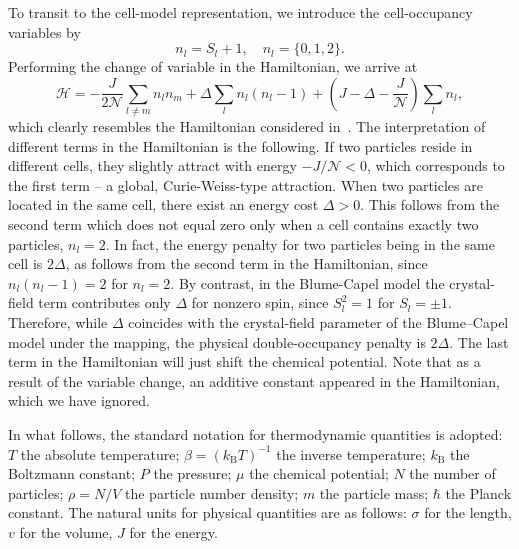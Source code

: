 \documentclass[pdflatex,sn-mathphys-num]{sn-jnl}%
\theoremstyle{thmstyleone}%
\theoremstyle{thmstyletwo}%
\theoremstyle{thmstylethree}%
\begin{document}
	To transit to the cell-model representation, we introduce the cell-occupancy variables by
	\begin{equation}
		n_l = S_l + 1, \quad n_l = \{0,1,2\}.
	\end{equation}
	Performing the change of variable in the Hamiltonian, we arrive at
	\begin{equation}
		\label{eq:hamiltonian}
		\mathscr{H} = -\frac{J}{2\mathscr{N}} \sum_{l \neq m} n_l n_m + \Delta \sum_l n_l (n_l - 1) + \left(J - \Delta - \frac{J}{\mathscr{N}}\right) \sum_l n_l,
	\end{equation}
	which clearly resembles the Hamiltonian considered in~\cite[Eq.~(1)]{LYZ21}.
	The interpretation of different terms in the Hamiltonian is the following. If two particles reside in different cells, they slightly attract with energy $-J/\mathscr{N} < 0$, which corresponds to the first term -- a global, Curie-Weiss-type attraction. When two particles are located in the same cell, there exist an energy cost $\Delta > 0$. This follows from the second term which does not equal zero only when a cell contains exactly two particles, $n_l=2$. In fact, the energy penalty for two particles being in the same cell is $2\Delta$, as follows from the second term in the Hamiltonian, since $n_l(n_l-1) =2$ for $n_l=2$. By contrast, in the Blume-Capel model the crystal-field term contributes only $\Delta$ for nonzero spin, since $S_l^2=1$ for $S_l = \pm 1$. Therefore, while $\Delta$ coincides with the crystal-field parameter of the Blume--Capel model under the mapping, the physical double-occupancy penalty is $2\Delta$. The last term in the Hamiltonian will just shift the chemical potential. Note that as a result of the variable change, an additive constant appeared in the Hamiltonian, which we have ignored.
	
	In what follows, the standard notation for thermodynamic quantities is adopted: $T$ the absolute temperature; $\beta = (k_{\mathrm B} T)^{-1}$ the inverse temperature; $k_{\mathrm B}$ the Boltzmann constant; $P$ the pressure; $\mu$ the chemical potential; $N$ the number of particles; $\rho = N/V$ the particle number density; $m$ the particle mass; $\hbar$ the Planck constant. The natural units for physical quantities are as follows: $\sigma$ for the length, $v$ for the volume, $J$ for the energy.
	
\end{document}

